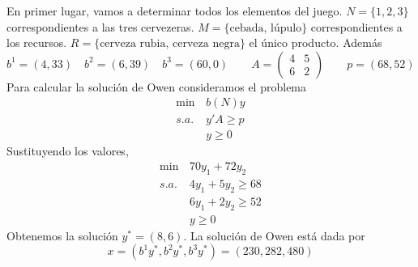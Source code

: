 \documentclass[twoside]{article}
\begin{document}
\begin{solucion}
En primer lugar, vamos a determinar todos los elementos del juego. $N=\{1,2,3\}$ correspondientes a las tres cervezeras. $M=\{\text{cebada, lúpulo}\}$ correspondientes a los recursos. $R=\{\text{cerveza rubia, cerveza negra}\}$ el único producto. Además
$$
b^1 = (4,33) \quad b^2 =(6,39) \quad b^3 = (60,0) \qquad A = \begin{pmatrix}
4 & 5\\
6 & 2
\end{pmatrix} \qquad p = (68,52)
$$
Para calcular la solución de Owen consideramos el problema
\begin{align*}
\min\, & b(N)y\\
s.a.\,&y'A\geq p\\
& y\geq 0
\end{align*}
Sustituyendo los valores,
\begin{align*}
\min\, & 70y_1 + 72y_2\\
s.a.\,&
4y_1 + 5y_2\geq 68\\
&6y_1 + 2y_2 \geq 52\\
& y\geq 0
\end{align*}
Obtenemos la solución $y^* = (8,6)$. La solución de Owen está dada por
$$
x = (b^1y^*,b^2y^*,b^3y^*) = (230,282,480) 
$$
\end{solucion}
\end{document}
